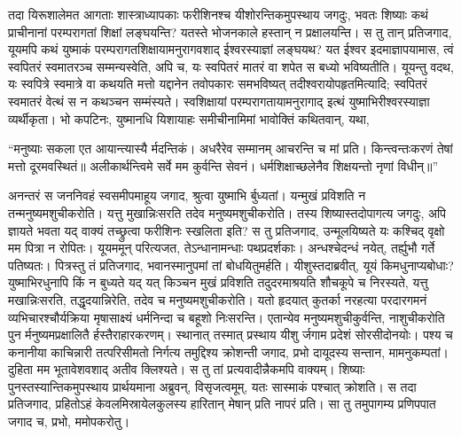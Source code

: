 \adhyAya
{}
\vakya तदा यिरूशालेमत आगताः शास्त्राध्यापकाः फरीशिनश्च यीशोरन्तिकमुपस्थाय जगदुः,
\vakya भवतः शिष्याः कथं प्राचीनानां परम्परागतां शिक्षां लङ्घयन्ति? यतस्ते भोजनकाले हस्तान् न प्रक्षालयन्ति।
\vakya स तु तान् प्रतिजगाद, यूयमपि कथं युष्माकं परम्परागतशिक्षायामनुरागवशाद् ईश्वरस्याज्ञां लङ्घयथ?
\vakya यत ईश्वर इदमाज्ञापयामास, त्वं स्वपितरं स्वमातरञ्च सम्मन्यस्वेति, अपि च, यः स्वपितरं मातरं वा शपेत स बध्यो भविष्यतीति।
\vakya यूयन्तु वदथ, यः स्वपित्रे स्वमात्रे वा कथयति मत्तो यद्दानेन तवोपकारः समभविष्यत् तदीश्वरायोपहृतमित्यादि;
\vakya स्वपितरं स्वमातरं वेत्थं स न कथञ्चन सम्मंस्यते। स्वशिक्षायां परम्परागतायामनुरागाद् इत्थं युष्माभिरीश्वरस्याज्ञा व्यर्थीकृता।
\vakya भो कपटिनः, युष्मानधि यिशायाहः समीचीनामिमां भावोक्तिं कथितवान्, यथा,
\begin{poem}
\startwithvakya “मनुष्याः सकला एत आयान्त्यास्यै र्मदन्तिकं।
\pline अधरैरेव सम्मानम् आचरन्ति च मां प्रति।
\pline किन्त्वन्तःकरणं तेषां मत्तो दूरमवस्थितं॥
\vakya अलीकार्थन्त्विमे सर्वे मम कुर्वन्ति सेवनं।
\pline धर्मशिक्षाच्छलेनैव शिक्षयन्तो नृणां विधीन्॥”
\end{poem}
\vakya अनन्तरं स जननिवहं स्वसमीपमाहूय जगाद, श्रुत्वा युष्माभि र्बुध्यतां।
\vakya यन्मुखं प्रविशति न तन्मनुष्यमशुचीकरोति। यत्तु मुखान्निःसरति तदेव मनुष्यमशुचीकरोति।
\vakya तस्य शिष्यास्तदोपागत्य जगदुः, अपि ज्ञायते भवता यद् वाक्यं तच्छ्रुत्वा फरीशिनः स्खलिता इति?
\vakya स तु प्रतिजगाद, उन्मूलयिष्यते यः कश्चिद् वृक्षो मम पित्रा न रोपितः।
\vakya यूयममून् परित्यजत, तेऽन्धानामन्धाः पथप्रदर्शकाः। अन्धश्चेदन्धं नयेत्, तर्ह्युभौ गर्ते पतिष्यतः।
\vakya पित्रस्तु तं प्रतिजगाद, भवानस्मानुपमां तां बोधयितुमर्हति।
\vakya यीशुस्तदाब्रवीत्, यूयं किमधुनाप्यबोधाः?
\vakya युष्माभिरधुनापि किं न बुध्यते यद् यत् किञ्चन मुखं प्रविशति तदुदरमाश्रयति शौचकूपे च निरस्यते,
\vakya यत्तु मखान्निःसरति, तद्धृदयान्निरेति, तदेव च मनुष्यमशुचीकरोति।
\vakya यतो हृदयात् कुतर्का नरहत्या परदारगमनं व्यभिचारश्चौर्यक्रिया मृषासाक्ष्यं धर्मनिन्दा च बहूशो निःसरन्ति।
\vakya एतान्येव मनुष्यमशुचीकुर्वन्ति, नाशुचीकरोति पुन र्मनुष्यमप्रक्षालितै र्हस्तैराहारकरणम्।
\vakya स्थानात् तस्मात् प्रस्थाय यीशु र्जगाम प्रदेशं सोरसीदोनयोः।
\vakya पश्य च कनानीया काचिन्नारी तत्परिसीमतो निर्गत्य तमुद्दिश्य क्रोशन्ती जगाद, प्रभो दायूदस्य सन्तान, मामनुकम्पतां। दुहिता मम भूतावेशवशाद् अतीव क्लिश्यते।
\vakya स तु तां प्रत्यवादीन्नैकमपि वाक्यम्। शिष्याः पुनस्तस्यान्तिकमुपस्थाय प्रार्थयमाना अब्रुवन्, विसृजत्वमूम्, यतः सास्माकं पश्चात् क्रोशति।
\vakya स तदा प्रतिजगाद, प्रहितोऽहं केवलमिस्रायेलकुलस्य हारितान् मेषान् प्रति नापरं प्रति।
\vakya सा तु तमुपागम्य प्रणिपपात जगाद च, प्रभो, ममोपकरोतु।
